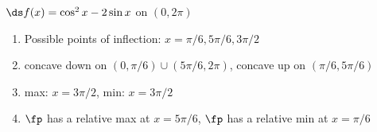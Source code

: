 {$\ds f(x) = \cos^2 x-2\sin x$ on $(0,2\pi)$
}
{\begin{enumerate}[label=(\alph*)]
\item Possible points of inflection: $x=\pi/6,5\pi/6,3\pi/2$
\item concave down on $(0,\pi/6)\cup(5\pi/6,2\pi)$,
concave up on $(\pi/6,5\pi/6)$
\item max: $x=3\pi/2$, min: $x=3\pi/2$
\item $\fp$ has a relative max at $x=5\pi/6$, $\fp$ has a relative min at $x=\pi/6$
\end{enumerate}}
